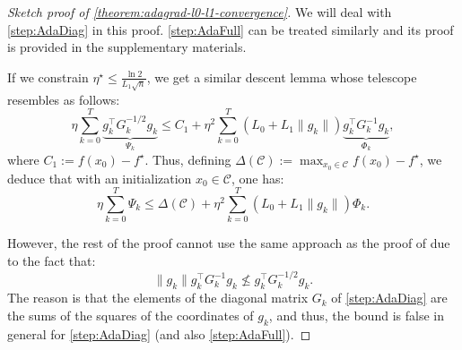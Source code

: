 \documentclass{article}
\theoremstyle{plain}
\theoremstyle{definition}
\theoremstyle{remark}
\begin{document}
\begin{proof}[Sketch proof of \cref{theorem:adagrad-l0-l1-convergence}]
    We will deal with \ref{step:AdaDiag} in this proof. \ref{step:AdaFull} can be treated similarly and its proof is provided in the supplementary materials. 
    
    If we constrain $\eta^\star \leq \frac{\ln 2}{L_1\sqrt{n}}$, we get a similar descent lemma whose telescope resembles  as follows: 
    \begin{equation*}
        \eta \sum_{k = 0}^T  \underbrace{g_k^\top G_k^{-1/2} g_k}_{\Psi_k} \leq C_1 + \eta^2 \sum_{k = 0}^T (L_0 + L_1\|g_k\|) \underbrace{g_k^\top G_k^{-1} g_k}_{\Phi_k},
    \end{equation*}
    where $C_1:= {f(x_0) - f^\star}$. Thus, defining $\Delta(\mathcal{C}):= \max_{x_0 \in \mathcal{C}} f(x_0) - f^\star$, we deduce that with an initialization $x_0 \in \mathcal{C}$, one has:
    \begin{equation}
        \label{eq:telescope-abstract}
        \eta \sum_{k = 0}^T \Psi_k \leq \Delta(\mathcal{C}) + \eta^2 \sum_{k = 0}^T (L_0 + L_1\|g_k\|) \Phi_k.
    \end{equation}
    
    However, the rest of the proof cannot use the same approach as the proof of  due to the fact that:
    \begin{equation*}
        \|g_k\|g_k^\top G_k^{-1}g_k \nleq g_k^\top G_k^{-1/2}g_k.
    \end{equation*}
    The reason is that the elements of the diagonal matrix $G_k$ of \ref{step:AdaDiag} are the sums of the squares of the coordinates of $g_k$, and thus, the bound is false in general for \ref{step:AdaDiag} (and also \ref{step:AdaFull}).
        

\end{proof}
\end{document}
